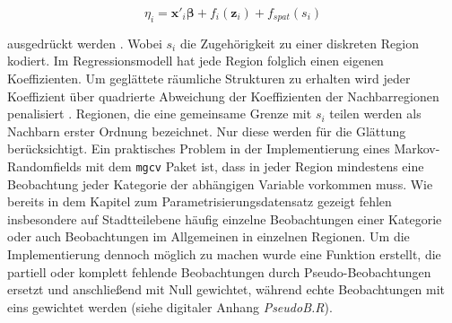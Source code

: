 \documentclass{Vorlage}
\begin{document}
\begin{equation}
\eta_{i} =\mathbf{x}'_i \boldsymbol{\beta}+f_{i}(\mathbf{z}_{i})+f_{spat}(s_i)
\end{equation}


ausgedrückt werden \cite[p. 541]{fahrmeir2013regression}. Wobei $s_i$ die Zugehörigkeit zu einer diskreten Region kodiert. Im Regressionsmodell hat jede Region folglich einen eigenen Koeffizienten. Um geglättete räumliche Strukturen zu erhalten wird jeder Koeffizient über quadrierte Abweichung der Koeffizienten der Nachbarregionen penalisiert \cite[p. 522]{fahrmeir2013regression}. Regionen, die eine gemeinsame Grenze mit $s_i$ teilen werden als Nachbarn erster Ordnung bezeichnet. Nur diese werden für die Glättung berücksichtigt.
Ein praktisches Problem in der Implementierung eines Markov-Randomfields mit dem \texttt{mgcv} Paket ist, dass in jeder Region mindestens eine Beobachtung jeder Kategorie der abhängigen Variable vorkommen muss. Wie bereits in dem Kapitel zum Parametrisierungsdatensatz gezeigt fehlen insbesondere auf Stadtteilebene häufig einzelne Beobachtungen einer Kategorie oder auch Beobachtungen im Allgemeinen in einzelnen Regionen. Um die Implementierung dennoch möglich zu machen wurde eine Funktion erstellt, die partiell oder komplett fehlende Beobachtungen durch Pseudo-Beobachtungen ersetzt und anschließend mit Null gewichtet, während echte Beobachtungen mit eins gewichtet werden (siehe digitaler Anhang \textit{PseudoB.R}).
\end{document}

